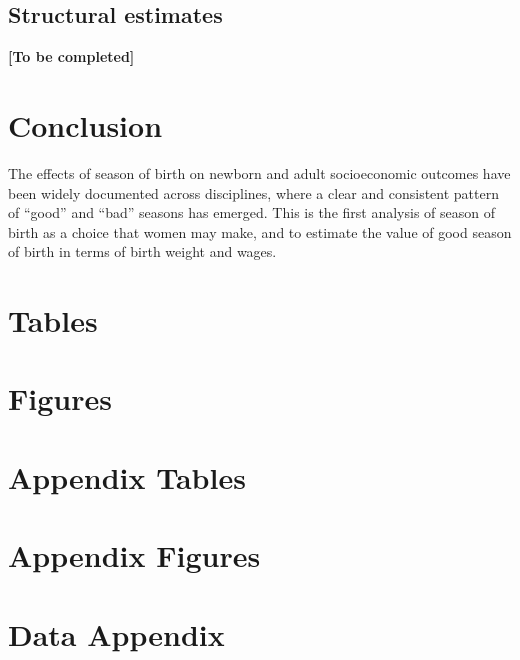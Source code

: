 \documentclass[a4paper, 12 pt]{article}
\theoremstyle{plain}
\begin{document}
\begin{doublespace}
\subsection{Structural estimates}
\textbf{[To be completed]}

\newpage

\section{Conclusion}
The effects of season of birth on newborn and adult socioeconomic outcomes have been widely documented across disciplines, where a clear and consistent pattern of ``good'' and ``bad'' seasons has emerged. This is the first analysis of season of birth as a choice that women may make, and to estimate the value of good season of birth in terms of birth weight and wages.



\newpage
%
%
%





\newpage
\section*{Tables}


\newpage
\section*{Figures}


\clearpage
\appendix
\section{Appendix Tables}


\clearpage
\section{Appendix Figures}



\section{Data Appendix}
\label{bqScn:datApp}

\end{doublespace}
\end{document}
